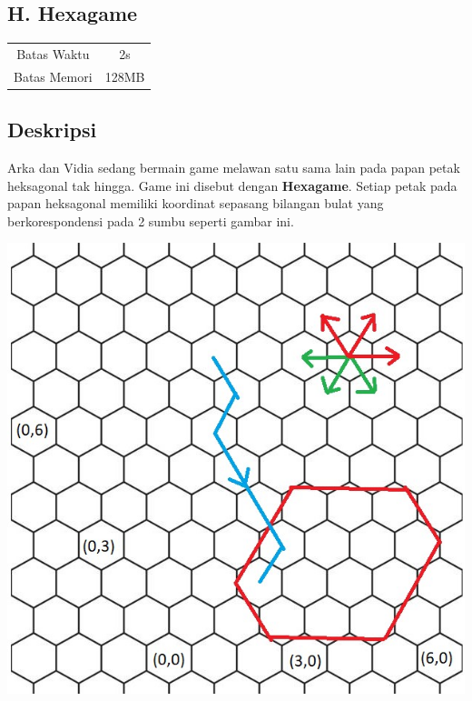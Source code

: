 \documentclass{article}
\begin{document}
\begin{center}
    \section*{H. Hexagame} %

    \begin{tabular}{ | c c | }
        \hline
        Batas Waktu  & 2s \\    %
        Batas Memori & 128MB \\  %
        \hline
    \end{tabular}
\end{center}

\subsection*{Deskripsi}
Arka dan Vidia sedang bermain game melawan satu sama lain pada papan petak heksagonal tak hingga. Game ini disebut dengan \textbf{Hexagame}. Setiap petak pada papan heksagonal memiliki koordinat sepasang bilangan bulat yang berkorespondensi pada 2 sumbu seperti gambar ini. 

\begin{center}
    \includegraphics[scale = 0.4]{hexagon.jpg}
\end{center}
\end{document}
